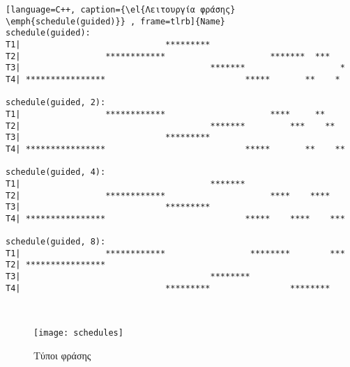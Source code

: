  \begin{spacing}{1.2}
\begin{lstlisting}[language=C++, caption={\el{Λειτουργία φράσης} \emph{schedule(guided)}} , frame=tlrb]{Name}
schedule(guided):
T1|                             *********                       
T2|                 ************                     *******  ***   
T3|                                      *******                   *
T4| ****************                            *****       **    * 

schedule(guided, 2): 
T1|                 ************                     ****     **    
T2|                                      *******         ***    **  
T3|                             *********                           
T4| ****************                            *****       **    **

schedule(guided, 4):   
T1|                                      *******                    
T2|                 ************                     ****    ****   
T3|                             *********                           
T4| ****************                            *****    ****    ***

schedule(guided, 8):   
T1|                 ************                 ********        ***
T2| ****************                                                
T3|                                      ********                   
T4|                             *********                ********
\end{lstlisting}
\end{spacing}
     
\ \\
\begin{figure}[h]
\texttt{[image: schedules]}
\centering
\captionsetup{justification=centering, singlelinecheck=false}
	\caption{Τύποι φράσης }
\label{fig:schedules}
\end{figure}

\ \\
